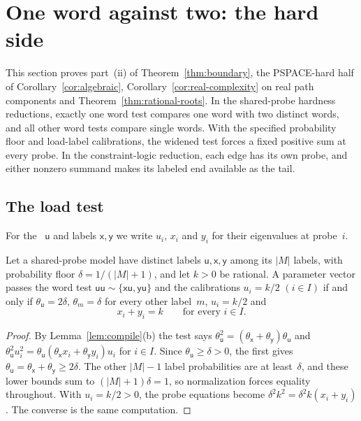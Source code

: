 
\section{One word against two: the hard side}\label{sec:hard}

This section proves part~(ii) of Theorem~\ref{thm:boundary}, the
PSPACE-hard half of Corollary~\ref{cor:algebraic},
Corollary~\ref{cor:real-complexity} on real path components and
Theorem~\ref{thm:rational-roots}.
In the shared-probe hardness reductions, exactly one word test compares one
word with two distinct words, and all other word tests compare single
words. With the specified probability floor and load-label calibrations,
the widened test forces a fixed positive sum at every probe. In the
constraint-logic reduction, each edge has its own probe, and either nonzero
summand makes its labeled end available as the tail.

\subsection{The load test}\label{sec:engine}

For the ~$\mathsf u$ and labels $\mathsf x,\mathsf y$ we write $u_i$, $x_i$ and $y_i$
for their eigenvalues at probe~$i$.

\begin{lemma}\label{lem:engine}
Let a shared-probe model have distinct labels $\mathsf u,\mathsf x,\mathsf
y$ among its $|M|$ labels, with probability floor $\delta=1/(|M|+1)$, and
let $k>0$ be rational. A parameter vector passes the word test
$\mathsf{uu}\sim\{\mathsf{xu},\mathsf{yu}\}$ and the calibrations
$u_i=k/2$ $(i\in I)$ if and only if $\theta_{\mathsf u}=2\delta$,
$\theta_m=\delta$ for every other label~$m$, $u_i=k/2$ and
\begin{equation}\label{eq:load}
  x_i+y_i=k\qquad\text{for every }i\in I.
\end{equation}
\end{lemma}

\begin{proof}
By Lemma~\ref{lem:compile}(b) the test says
$\theta_{\mathsf u}^2=(\theta_{\mathsf x}+\theta_{\mathsf y})\theta_{\mathsf u}$
and $\theta_{\mathsf u}^2u_i^2=\theta_{\mathsf u}(\theta_{\mathsf
x}x_i+\theta_{\mathsf y}y_i)u_i$ for $i\in I$. Since
$\theta_{\mathsf u}\ge\delta>0$, the first gives
$\theta_{\mathsf u}=\theta_{\mathsf x}+\theta_{\mathsf y}\ge2\delta$. The
other $|M|-1$ label probabilities are at least~$\delta$, and these lower
bounds sum to $(|M|+1)\delta=1$, so normalization forces equality
throughout. With $u_i=k/2>0$, the probe equations become
$\delta^2k^2=\delta^2k(x_i+y_i)$. The converse is the same computation.
\end{proof}


